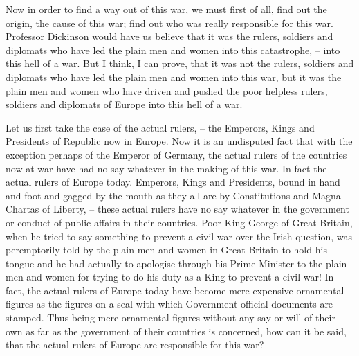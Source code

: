 Now in order to find a way out of this war, we must first of all,
find out the origin, the cause of this war;
find out who was really responsible for this war.
Professor Dickinson would have us believe that it was the rulers,
soldiers and diplomats who have led the plain men and women into this catastrophe,
-- into this hell of a war.
But I think, I can prove, that it was not the rulers,
soldiers and diplomats who have led the plain men and women into this war,
but it was the plain men and women who have driven and pushed the poor helpless rulers,
soldiers and diplomats of Europe into this hell of a war.

Let us first take the case of the actual rulers,  -- the Emperors, Kings and Presidents of Republic now in Europe.
Now it is an undisputed fact that with the exception perhaps of the Emperor of Germany,
the actual rulers of the countries now at war have had no say whatever in the making of this war.
In fact the actual rulers of Europe today.
Emperors, Kings and Presidents, bound in hand and foot and gagged by the mouth as they all are by Constitutions and Magna Chartas of Liberty,
-- these actual rulers have no say whatever in the government or conduct of public affairs in their countries.
Poor King George of Great Britain,
when he tried to say something to prevent a civil war over the Irish question,
was peremptorily told by the plain men and women in Great Britain to hold his tongue
and he had actually to apologise through his Prime Minister to the plain men and women
for trying to do his duty as a King to prevent a civil war!
In fact, the actual rulers of Europe today have become mere expensive ornamental figures as the figures on a seal with which Government official documents are stamped.
Thus being mere ornamental figures without any say or will of their own as far as the government of their countries is concerned,
how can it be said, that the actual rulers of Europe are responsible for this war?

